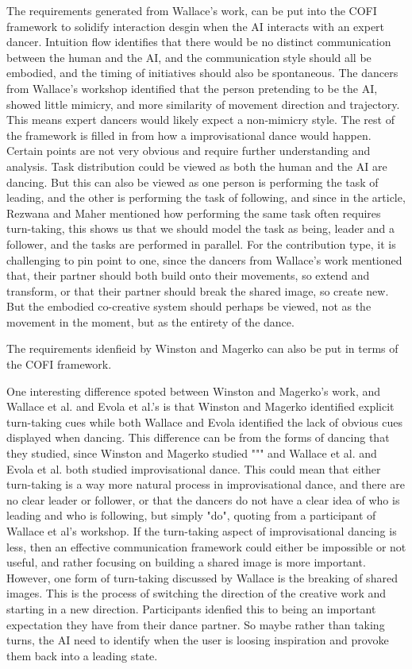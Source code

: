\documentclass[final,5p,times,twocolumn,authoryear]{article}
\begin{document}
The requirements generated from Wallace's work, can be put into the COFI
framework to solidify interaction desgin when the AI interacts with an
expert dancer. Intuition flow identifies that there would be no distinct
communication between the human and the AI, and the communication style
should all be embodied, and the timing of initiatives should also be
spontaneous. The dancers from Wallace's workshop identified that the
person pretending to be the AI, showed little mimicry, and more
similarity of movement direction and trajectory. This means expert
dancers would likely expect a non-mimicry style. The rest of the
framework is filled in from how a improvisational dance would happen.
Certain points are not very obvious and require further understanding
and analysis. Task distribution could be viewed as both the human and
the AI are dancing. But this can also be viewed as one person is
performing the task of leading, and the other is performing the task of
following, and since in the article, Rezwana and Maher mentioned how
performing the same task often requires turn-taking, this shows us that
we should model the task as being, leader and a follower, and the tasks
are performed in parallel. For the contribution type, it is challenging
to pin point to one, since the dancers from Wallace's work mentioned
that, their partner should both build onto their movements, so extend
and transform, or that their partner should break the shared image, so
create new. But the embodied co-creative system should perhaps be
viewed, not as the movement in the moment, but as the entirety of the dance.

The requirements idenfieid by Winston and Magerko can also be put in
terms of the COFI framework.



One interesting difference spoted between Winston and Magerko's work, and
Wallace et al. and Evola et al.'s is that Winston and Magerko identified explicit
turn-taking cues while both Wallace and Evola identified the lack of
obvious cues displayed when dancing. This difference can be from the
forms of dancing that they studied, since Winston and Magerko studied
""" and Wallace et al. and Evola et al. both studied improvisational
dance. This could mean that either turn-taking is a way more natural
process in improvisational dance, and there are no clear leader or
follower, or that the dancers do not have a clear idea of who is leading
and who is following, but simply "do", quoting from a participant of
Wallace et al's workshop. If the turn-taking aspect of improvisational
dancing is less, then an effective communication framework could either
be impossible or not useful, and rather focusing on building a shared
image is more important. However, one form of turn-taking discussed
by Wallace is the breaking of shared images. This is the process of
switching the direction of the creative work and starting in a new
direction. Participants idenfied this to being an important expectation
they have from their dance partner. So maybe rather than taking turns,
the AI need to identify when the user is loosing inspiration and provoke
them back into a leading state.
\end{document}
